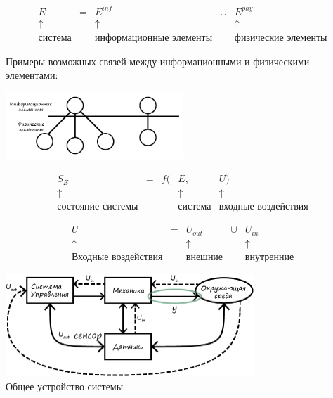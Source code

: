 \documentclass[12pt]{article}
\begin{document}
\begin{sloppypar}
    \[
        \begin{array}{ccccc}
            E              & = & E^{\textit{inf}}               & \cup & E^{phy}                    \\
            \uparrow       &   & \uparrow                       &      & \uparrow                   \\
            \text{система} &   & \text{информационные элементы} &      & \text{физические элементы}
        \end{array}
    \]

    Примеры возможных связей между информационными и физическими элементами:
    \begin{center}
        \includegraphics[width=0.5\textwidth]{graphics/Информационные_и_физические_элементы.png}
    \end{center}

    \[
        \begin{array}{ccccc}
            S_E                      & = & f( & E,             & U)                         \\
            \uparrow                 &   &    & \uparrow       & \uparrow                   \\
            \text{состояние системы} &   &    & \text{система} & \text{входные воздействия}
        \end{array}
    \]

    \[
        \begin{array}{ccccc}
            U                          & = & U_{\textit{out}} & \cup & U_{in}            \\
            \uparrow                   &   & \uparrow         &      & \uparrow          \\
            \text{Входные воздействия} &   & \text{внешние}   &      & \text{внутренние}
        \end{array}
    \]

    \begin{center}
        \includegraphics[width=0.7\textwidth]{graphics/Система.png} \\
        Общее устройство системы
    \end{center}



\end{sloppypar}
\end{document}
